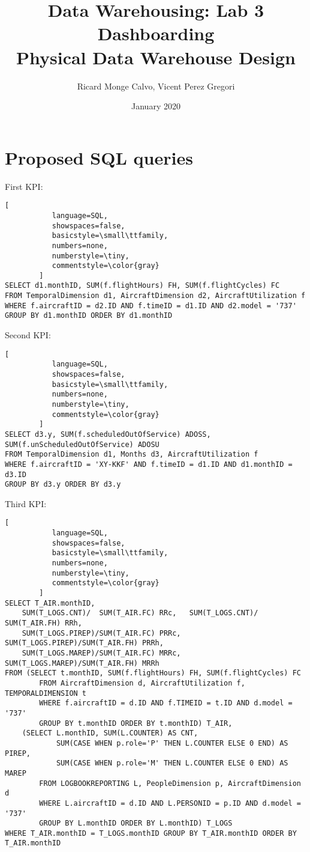 \documentclass{article} %
\title{%
    Data Warehousing: Lab 3 Dashboarding \\
    \large Physical Data Warehouse Design}
\author{Ricard Monge Calvo, Vicent Perez Gregori}
\date{January 2020}
\begin{document}
\maketitle

\section{Proposed SQL queries}

First KPI:
\begin{lstlisting}[
           language=SQL,
           showspaces=false,
           basicstyle=\small\ttfamily,
           numbers=none,
           numberstyle=\tiny,
           commentstyle=\color{gray}
        ]
SELECT d1.monthID, SUM(f.flightHours) FH, SUM(f.flightCycles) FC
FROM TemporalDimension d1, AircraftDimension d2, AircraftUtilization f
WHERE f.aircraftID = d2.ID AND f.timeID = d1.ID AND d2.model = '737'
GROUP BY d1.monthID ORDER BY d1.monthID
\end{lstlisting}
Second KPI:
\begin{lstlisting}[
           language=SQL,
           showspaces=false,
           basicstyle=\small\ttfamily,
           numbers=none,
           numberstyle=\tiny,
           commentstyle=\color{gray}
        ]
SELECT d3.y, SUM(f.scheduledOutOfService) ADOSS,
SUM(f.unScheduledOutOfService) ADOSU
FROM TemporalDimension d1, Months d3, AircraftUtilization f
WHERE f.aircraftID = 'XY-KKF' AND f.timeID = d1.ID AND d1.monthID = d3.ID
GROUP BY d3.y ORDER BY d3.y
\end{lstlisting}
Third KPI:
\begin{lstlisting}[
           language=SQL,
           showspaces=false,
           basicstyle=\small\ttfamily,
           numbers=none,
           numberstyle=\tiny,
           commentstyle=\color{gray}
        ]
SELECT T_AIR.monthID,
    SUM(T_LOGS.CNT)/  SUM(T_AIR.FC) RRc,   SUM(T_LOGS.CNT)/  SUM(T_AIR.FH) RRh,
    SUM(T_LOGS.PIREP)/SUM(T_AIR.FC) PRRc,  SUM(T_LOGS.PIREP)/SUM(T_AIR.FH) PRRh,
    SUM(T_LOGS.MAREP)/SUM(T_AIR.FC) MRRc,  SUM(T_LOGS.MAREP)/SUM(T_AIR.FH) MRRh
FROM (SELECT t.monthID, SUM(f.flightHours) FH, SUM(f.flightCycles) FC
        FROM AircraftDimension d, AircraftUtilization f, TEMPORALDIMENSION t
        WHERE f.aircraftID = d.ID AND f.TIMEID = t.ID AND d.model = '737'
        GROUP BY t.monthID ORDER BY t.monthID) T_AIR,
    (SELECT L.monthID, SUM(L.COUNTER) AS CNT,
	        SUM(CASE WHEN p.role='P' THEN L.COUNTER ELSE 0 END) AS PIREP,
	        SUM(CASE WHEN p.role='M' THEN L.COUNTER ELSE 0 END) AS MAREP
        FROM LOGBOOKREPORTING L, PeopleDimension p, AircraftDimension d
        WHERE L.aircraftID = d.ID AND L.PERSONID = p.ID AND d.model = '737'
        GROUP BY L.monthID ORDER BY L.monthID) T_LOGS
WHERE T_AIR.monthID = T_LOGS.monthID GROUP BY T_AIR.monthID ORDER BY T_AIR.monthID
\end{lstlisting}
\end{document}
